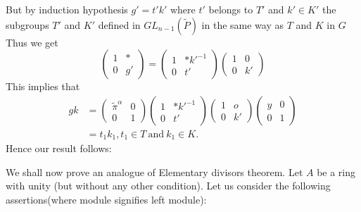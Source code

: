 But by induction hypothesis $g'= t' k'$ where $t'$ belongs to $T'$ and
$k' \in K'$ the subgroups $T'$ and $K'$ defined in $G
L_{n-1}(\widetilde{P})$ in the same way as $T$ and $K$ in $G$ Thus we
get 
\begin{equation*}
  \begin{pmatrix}
    1&*\\
    0&g'
  \end{pmatrix}
  =
  \begin{pmatrix}
    1&*k'^{-1}\\
    0 & t'
  \end{pmatrix}
  \begin{pmatrix}
    1 & 0\\
    0 & k'
  \end{pmatrix}
\end{equation*}
This implies that
\begin{align*}
  gk & =
  \begin{pmatrix}
    \widetilde{\pi}^{\alpha}&0\\
    0&1
  \end{pmatrix}
  \begin{pmatrix}
    1&*k'^{-1}\\
    0 & t'
  \end{pmatrix}
  \begin{pmatrix}
    1 & o\\
    0 & k'
  \end{pmatrix}
  \begin{pmatrix}
    y&0\\
    0&1
  \end{pmatrix}\\
  & =t_1 k_1,t_1 \in T ~\text{and}~ k_1 \in K. 
\end{align*}
Hence our result follows:

We shall now prove an analogue of Elementary divisors theorem. Let $A$
be a ring with unity (but without any other condition). Let us
consider the following assertions(where module signifies left module): 

